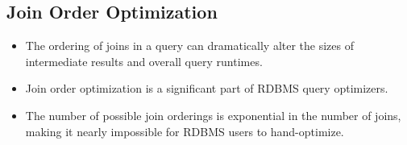 \documentclass{article}
\begin{document}
\subsection*{Join Order Optimization}
\begin{itemize}
    \item The ordering of joins in a query can dramatically alter the sizes of intermediate results and overall query runtimes.
    \item Join order optimization is a significant part of RDBMS query optimizers.
    \item The number of possible join orderings is exponential in the number of joins, making it nearly impossible for RDBMS users to hand-optimize.
\end{itemize}
\end{document}
